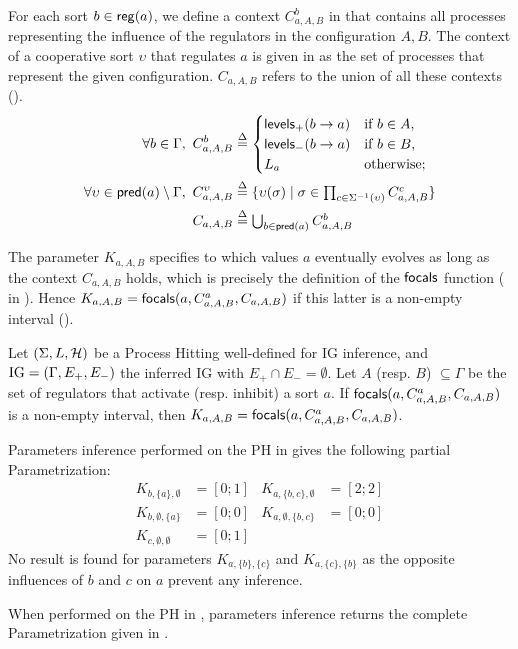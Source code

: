 For each sort $b \in \mathsf{reg}({a})$, we define a context $C^b_{a,A,B}$ in  that contains all processes representing the influence of the regulators in the configuration $A,B$.
The context of a cooperative sort $\upsilon$ that regulates $a$ is given in  as the set of processes that represent the given configuration.
$C_{a,A,B}$ refers to the union of all these contexts ().
\begin{align}
\label{eq:param_context}
\forall b\in\Gamma,~
C_{a,A,B}^b & \stackrel{\Delta}= \begin{cases}
\mathsf{levels}_+(b\rightarrow a) & \text{if $b \in A$,}\\
\mathsf{levels}_-(b\rightarrow a) & \text{if $b \in B$,}\\
L_a		& \text{otherwise;}\\
\end{cases}
\\
\label{eq:param_context_coop}
\forall \upsilon \in \mathsf{pred}(a)\setminus\Gamma,~
C_{a,A,B}^\upsilon & \stackrel{\Delta}= \{
\upsilon(\sigma) \mid \sigma \in \textstyle\prod_{c\in\Sigma^{-1}(\upsilon)}C_{a,A,B}^c \}
\\
C_{a,A,B} & \stackrel{\Delta}= \textstyle\bigcup_{b\in\mathsf{pred}(a)} C^b_{a,A,B}
\label{eq:K-ctx}
\end{align}

The parameter $K_{a,A,B}$ specifies to which values $a$ eventually evolves as long as the context
$C_{a,A,B}$ holds, which is precisely the definition of the $\mathsf{focals}$ function
( in ).
Hence $K_{a,A,B} = \mathsf{focals}(a,C^a_{a,A,B},C_{a,A,B})$ if this latter is a non-empty interval
().

\begin{proposition}
\label{pps:param_K}
Let $(\Sigma, L, \mathcal{H})$ be a Process Hitting well-defined for IG inference, and $\mathrm{IG} = (\Gamma,
E_+, E_-)$ the inferred IG with $E_+\cap E_-=\emptyset$.
Let $A$ (resp. $B$) $\subseteq \Gamma$ be the set of regulators that activate (resp. inhibit) a sort
$a$.
If $\mathsf{focals}(a,C^a_{a,A,B},C_{a,A,B})$ is a non-empty interval, 
	then $K_{a,A,B} = \mathsf{focals}(a, C^a_{a,A,B}, C_{a,A,B})$.
\end{proposition}

\begin{example*}
Parameters inference performed on the PH in  gives the following partial Parametrization:
\begin{align*}
K_{b,\{a\},\emptyset} &= [0 ; 1] & K_{a,\{b,c\},\emptyset} &= [2 ; 2] \\
K_{b,\emptyset,\{a\}} &= [0 ; 0] & K_{a,\emptyset,\{b,c\}} &= [0 ; 0] \\
K_{c,\emptyset,\emptyset} &= [0 ; 1]
\end{align*}
No result is found for parameters $K_{a,\{b\},\{c\}}$ and $K_{a,\{c\},\{b\}}$ as the opposite influences of $b$ and $c$ on $a$ prevent any inference.

When performed on the PH in , parameters inference returns the complete Parametrization given in .
\end{example*}

